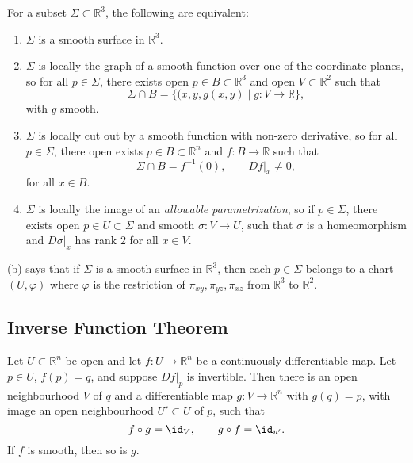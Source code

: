 \documentclass[12pt]{article}
\begin{document}
\begin{theorem}\label{thm:smoothness}
	For a subset $\Sigma \subset \mathbb{R}^3$, the following are equivalent:
	\begin{enumerate}[\normalfont(a)]
		\item $\Sigma$ is a smooth surface in $\mathbb{R}^3$.
		\item $\Sigma$ is locally the graph of a smooth function over one of the coordinate planes, so for all $p \in \Sigma$, there exists open $p \in B \subset \mathbb{R}^3$ and open $V \subset \mathbb{R}^2$ such that
			\[
				\Sigma \cap B = \{(x, y, g(x, y) \mid g : V \to \mathbb{R}\}
			,\]
			with $g$ smooth.
		\item $\Sigma$ is locally cut out by a smooth function with non-zero derivative, so for all $p \in \Sigma$, there open exists $p \in B \subset \mathbb{R}^{n}$ and $f : B \to \mathbb{R}$ such that
			\[
			\Sigma \cap B = f^{-1}(0), \qquad Df|_x \neq 0,
			\]
			for all $x \in B$.
		\item $\Sigma$ is locally the image of an \emph{allowable parametrization}, so if $p \in \Sigma$, there exists open $p \in U \subset \Sigma$ and smooth $\sigma : V \to U$, such that $\sigma$ is a homeomorphism and $D\sigma|_x$ has rank $2$ for all $x \in V$.
	\end{enumerate}
\end{theorem}

\begin{remark}
	(b) says that if $\Sigma$ is a smooth surface in $\mathbb{R}^3$, then each $p \in \Sigma$ belongs to a chart $(U, \varphi)$ where $\varphi$ is the restriction of $\pi_{xy}, \pi_{yz}, \pi_{xz}$ from $\mathbb{R}^3$ to $\mathbb{R}^2$.
\end{remark}

\subsection{Inverse Function Theorem}
\label{sub:inverse_function_theorem}

\begin{theorem}
	Let $U \subset \mathbb{R}^{n}$ be open and let $f : U \to \mathbb{R}^{n}$ be a continuously differentiable map. Let $p \in U$, $f(p) = q$, and suppose $Df|_p$ is invertible. Then there is an open neighbourhood $V$ of $q$ and a differentiable map $g : V \to \mathbb{R}^{n}$ with $g(q) = p$, with image an open neighbourhood $U' \subset U$ of $p$, such that
	\[
	f \circ g = \id_V, \qquad g \circ f = \id_{u'}
	.\]
	If $f$ is smooth, then so is $g$.
\end{theorem}
\end{document}
